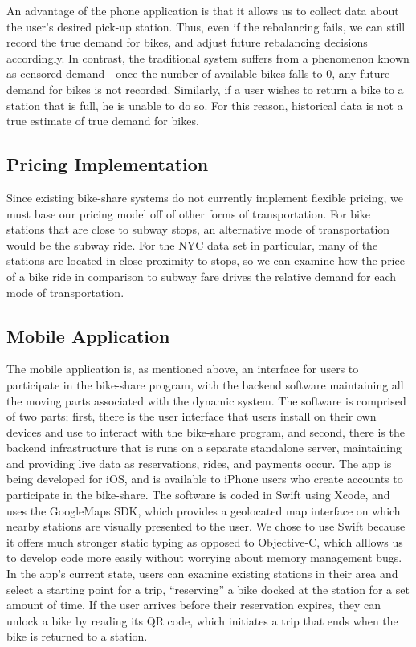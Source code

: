 \documentclass{sig-alternate}
\begin{document}
An advantage of the phone application is that it allows us to collect data about the user's desired pick-up station.  Thus, even if the rebalancing fails, we can still record the true demand for bikes, and adjust future rebalancing decisions accordingly.  In contrast, the traditional system suffers from a phenomenon known as censored demand - once the number of available bikes falls to 0, any future demand for bikes is not recorded.  Similarly, if a user wishes to return a bike to a station that is full, he is unable to do so.  For this reason, historical data is not a true estimate of true demand for bikes.

\subsection{Pricing Implementation}
Since existing bike-share systems do not currently implement flexible pricing, we must base our pricing model off of other forms of transportation.  For bike stations that are close to subway stops, an alternative mode of transportation would be the subway ride.  For the NYC data set in particular, many of the stations are located in close proximity to stops, so we can examine how the price of a bike ride in comparison to subway fare drives the relative demand for each mode of transportation.

\subsection{Mobile Application}
The mobile application is, as mentioned above, an interface for users to participate in the bike-share program, with the backend software maintaining all the moving parts associated with the dynamic system. The software is comprised of two parts; first, there is the user interface that users install on their own devices and use to interact with the bike-share program, and second, there is the backend infrastructure that is runs on a separate standalone server, maintaining and providing live data as reservations, rides, and payments occur. The app is being developed for iOS, and is available to iPhone users who create accounts to participate in the bike-share. The software is coded in Swift using Xcode, and uses the GoogleMaps SDK, which provides a geolocated map interface on which nearby stations are visually presented to the user. We chose to use Swift because it offers much stronger static typing as opposed to Objective-C, which alllows us to develop code more easily without worrying about memory management bugs.  In the app's current state, users can examine existing stations in their area and select a starting point for a trip, ``reserving'' a bike docked at the station for a set amount of time. If the user arrives before their reservation expires, they can unlock a bike by reading its QR code, which initiates a trip that ends when the bike is returned to a station.\newline
\end{document}
